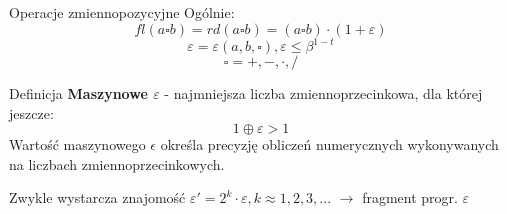 \begin{frame}{Operacje zmiennopozycyjne}
    Ogólnie:
    \[
    fl(a \square b) = rd(a \square b) = (a \square b) \cdot (1 + \varepsilon)
    \] \[
    \varepsilon = \varepsilon(a, b, \square), \varepsilon \le \beta^{1-t}
    \] \[
    \square = +, -, \cdot, /
    \]

    \begin{block}{Definicja}
        {\bf Maszynowe $\varepsilon$} - najmniejsza liczba zmiennoprzecinkowa, dla której jeszcze: \[
        1 \oplus \varepsilon > 1
        \]
        Wartość maszynowego $\epsilon$ określa precyzję obliczeń numerycznych wykonywanych na liczbach zmiennoprzecinkowych.
    \end{block}

    Zwykle wystarcza znajomość $\varepsilon' = 2^k \cdot \varepsilon, k \approx 1, 2, 3, ...$ $\rightarrow$ fragment progr. $\varepsilon$
\end{frame}
